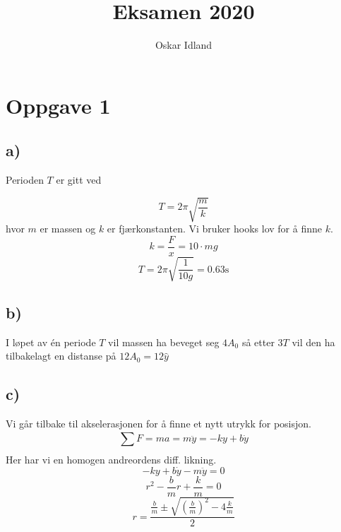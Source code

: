 \documentclass{article}
\author{Oskar Idland}
\title{Eksamen 2020}
\date{}
\begin{document}
\maketitle
\newpage
\section*{Oppgave 1}
\subsection*{a)}
Perioden $T$ er gitt ved

\[
T= 2π \sqrt{\frac{m}{k}}
\]
hvor $m$ er massen og $k$ er fjærkonstanten. Vi bruker hooks lov for å finne $k$. 
\[
k = \frac{F}{x} = 10 ⋅ mg 
\]
\[
T = 2π \sqrt{\frac{1}{10g}} = 0.63 \text{s}
\]

\subsection*{b)}
I løpet av én periode $T$ vil massen ha beveget seg $4A_0$ så etter $3T$ vil den ha tilbakelagt en distanse på $12A_0 = 12\hat{y}$

\subsection*{c)}
Vi går tilbake til akselerasjonen for å finne et nytt utrykk for posisjon. 
\[
∑_{}^{} F = ma = m \ddot{y} = - ky + b \dot{y}
\]
Her har vi en homogen andreordens diff. likning.
\[
-ky + b \dot{y} - m \ddot{y} = 0
\]
\[
r^2 -\frac{b}{m} r + \frac{k}{m} = 0
\]
\[
r = \frac{\frac{b}{m} ± \sqrt{\left(\frac{b}{m}\right)^2 - 4 \frac{k}{m}}}{2} 
\]
\end{document}
